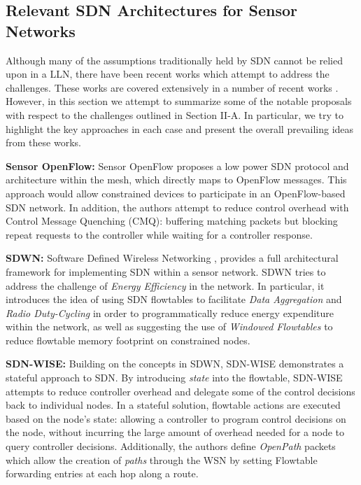 \subsection{Relevant SDN Architectures for Sensor Networks}
\label{sec_relevant_works}

Although many of the assumptions traditionally held by SDN cannot be relied upon in a LLN, there have been recent works which attempt to address the challenges. These works are covered extensively in a number of recent works \cite{wsdn_survey_taxonomy,sdwn_opportunities_challenges}. However, in this section we attempt to summarize some of the notable proposals with respect to the challenges outlined in Section II-A. In particular, we try to highlight the key approaches in each case and present the overall prevailing ideas from these works. 

\textbf{Sensor OpenFlow:} Sensor OpenFlow \cite{sensor_openflow} proposes a low power SDN protocol and architecture within the mesh, which directly maps to OpenFlow messages. This approach would allow constrained devices to participate in an OpenFlow-based SDN network. In addition, the authors attempt to reduce control overhead with Control Message Quenching (CMQ): buffering matching packets but blocking repeat requests to the controller while waiting for a controller response.

\textbf{SDWN:} Software Defined Wireless Networking \cite{sdwn}, provides a full architectural framework for implementing SDN within a sensor network. SDWN tries to address the challenge of \textit{Energy Efficiency} in the network. In particular, it introduces the idea of using SDN flowtables to facilitate \textit{Data Aggregation} and \textit{Radio Duty-Cycling} in order to programmatically reduce energy expenditure within the network, as well as suggesting the use of \textit{Windowed Flowtables} to reduce flowtable memory footprint on constrained nodes. 

\textbf{SDN-WISE:} Building on the concepts in SDWN, SDN-WISE \cite{sdn-wise} demonstrates a stateful approach to SDN. By introducing \textit{state} into the flowtable, SDN-WISE attempts to reduce controller overhead and delegate some of the control decisions back to individual nodes. In a stateful solution, flowtable actions are executed based on the node's state: allowing a controller to program control decisions on the node, without incurring the large amount of overhead needed for a node to query controller decisions. Additionally, the authors define \textit{OpenPath} packets which allow the creation of \textit{paths} through the WSN by setting Flowtable forwarding entries at each hop along a route.

